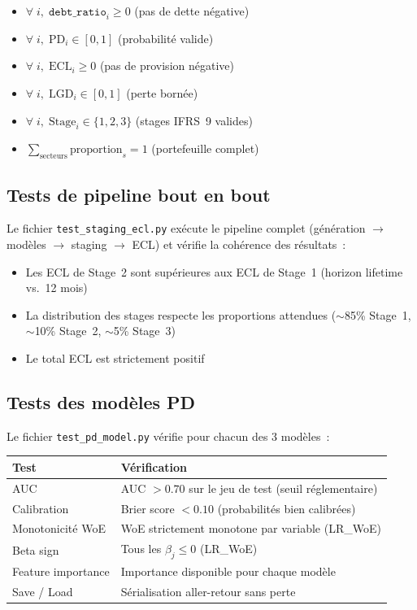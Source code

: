 \documentclass[12pt,a4paper]{article}
\begin{document}
\begin{definitionbox}
\begin{itemize}[noitemsep]
    \item $\forall\; i,\; \texttt{debt\_ratio}_i \geq 0$ (pas de dette n\'egative)
    \item $\forall\; i,\; \text{PD}_i \in [0, 1]$ (probabilit\'e valide)
    \item $\forall\; i,\; \text{ECL}_i \geq 0$ (pas de provision n\'egative)
    \item $\forall\; i,\; \text{LGD}_i \in [0, 1]$ (perte born\'ee)
    \item $\forall\; i,\; \text{Stage}_i \in \{1, 2, 3\}$ (stages IFRS~9 valides)
    \item $\sum_{\text{secteurs}} \text{proportion}_s = 1$ (portefeuille complet)
\end{itemize}
\end{definitionbox}

\subsection{Tests de pipeline bout en bout}

Le fichier \texttt{test\_staging\_ecl.py} ex\'ecute le pipeline complet (g\'en\'eration $\to$ mod\`eles $\to$ staging $\to$ ECL) et v\'erifie la coh\'erence des r\'esultats~:

\begin{itemize}[noitemsep]
    \item Les ECL de Stage~2 sont sup\'erieures aux ECL de Stage~1 (horizon lifetime vs.~12 mois)
    \item La distribution des stages respecte les proportions attendues ($\sim$85\% Stage~1, $\sim$10\% Stage~2, $\sim$5\% Stage~3)
    \item Le total ECL est strictement positif
\end{itemize}

\subsection{Tests des mod\`eles PD}

Le fichier \texttt{test\_pd\_model.py} v\'erifie pour chacun des 3 mod\`eles~:

\begin{center}
\begin{tabular}{lp{8cm}}
\toprule
\textbf{Test} & \textbf{V\'erification} \\
\midrule
AUC & AUC $> 0.70$ sur le jeu de test (seuil r\'eglementaire) \\
Calibration & Brier score $< 0.10$ (probabilit\'es bien calibr\'ees) \\
Monotonicit\'e WoE & WoE strictement monotone par variable (LR\_WoE) \\
Beta sign & Tous les $\beta_j \leq 0$ (LR\_WoE) \\
Feature importance & Importance disponible pour chaque mod\`ele \\
Save / Load & S\'erialisation aller-retour sans perte \\
\bottomrule
\end{tabular}
\end{center}
\end{document}
